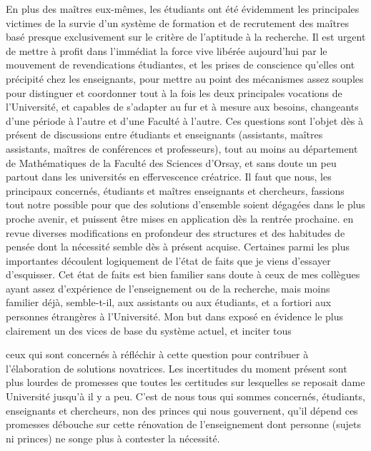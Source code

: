 \documentclass[11pt,a4paper]{article}
\begin{document}
En plus des maîtres eux-mêmes, les étudiants ont été évidemment les
principales victimes de la survie d'un système de formation et de
recrutement des maîtres basé presque exclusivement sur le critère de l'aptitude
à la recherche. Il est urgent de mettre à profit dans l'immédiat la force
vive libérée aujourd'hui par le mouvement de revendications étudiantes, et
les prises de conscience qu'elles ont précipité chez les enseignants,
pour mettre au point des mécanismes assez souples pour distinguer et
coordonner tout à la fois les deux principales vocations de l'Université, et capables
de s'adapter au fur et à mesure aux besoins, changeants d'une période à l'autre
et d'une Faculté à l'autre. Ces questions sont l'objet dès à présent de
discussions entre étudiants et enseignants (assistants, maîtres assistants,
maîtres de conférences et professeurs), tout au moins au département de
Mathématiques de la Faculté des Sciences d'Orsay, et sans doute un peu
partout dans les universités en effervescence créatrice. Il faut que nous,
les principaux concernés, étudiants et maîtres enseignants et chercheurs,
fassions tout notre possible pour que des solutions d'ensemble soient
dégagées dans le plus proche avenir, et puissent être mises en application dès
la rentrée prochaine. 
 en revue   diverses modifications en
profondeur des structures et des habitudes de
pensée dont la nécessité  semble dès à présent acquise. Certaines parmi les
plus importantes découlent logiquement de l'état de faits que je viens
d'essayer d'esquisser. Cet état de faits est bien familier sans doute à ceux
de mes collègues ayant assez d'expérience de l'enseignement ou de la
recherche, mais moins familier déjà, semble-t-il, aux assistants ou aux étudiants,
et a fortiori aux personnes étrangères à l'Université. Mon but dans 
 exposé   en évidence le plus clairement 
 un des vices de base du système actuel, et inciter tous

ceux qui sont concernés à réfléchir à cette question pour contribuer à
l'élaboration de solutions novatrices. Les incertitudes du moment présent
sont plus lourdes de promesses que toutes les certitudes sur lesquelles se
reposait dame Université jusqu'à il y a peu. C'est de nous tous qui sommes
concernés, étudiants, enseignants et chercheurs, non des princes qui nous
gouvernent, qu'il dépend   ces promesses 
débouche sur cette rénovation de l'enseignement dont
personne (sujets ni princes) ne songe plus à contester la nécessité.
\end{document}
